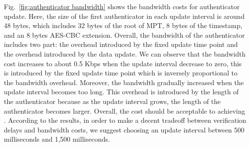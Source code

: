 



Fig.~\ref{fig:authenticator bandwidth} shows the bandwidth costs for authenticator update. %
Here, the size of the first authenticator in each update interval is around 48 bytes, which includes 32 bytes of the root of MPT, 8 bytes of the timestamp, and an 8 bytes AES-CBC extension. Overall, the bandwidth of the authenticator includes two part: the overhead introduced by the fixed update time point and the overhead introduced by the data update. We can observe that the bandwidth cost increases to about 0.5 Kbps when the update interval decrease to zero, this is introduced by the fixed update time point which is inversely proportional to the bandwidth overhead. Moreover, the bandwidth gradually increased when the update interval becomes too long. This overhead is introduced by the length of the authenticator because as the update interval grows, the length of the authenticator becomes larger. Overall, the cost should be acceptable to achieving \name. According to the results, in order to make a decent tradeoff between verification delays and bandwidth costs, we suggest choosing an update interval between 500 milliseconds and 1,500 milliseconds.




